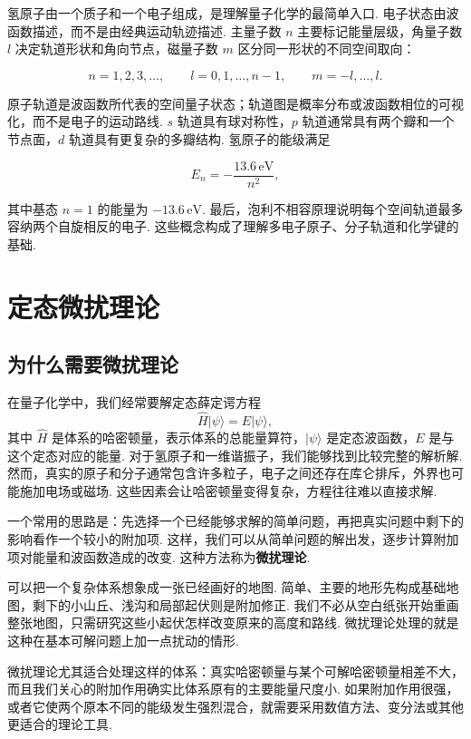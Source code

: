 \documentclass[UTF8,11pt,a4paper,openany]{ctexbook}
\newcommand{\ket}[1]{\lvert #1\rangle}\newcommand{\bra}[1]{\langle #1\rvert}
\newcommand{\term}[1]{\textbf{#1}}
\begin{document}
氢原子由一个质子和一个电子组成，是理解量子化学的最简单入口. 电子状态由波函数描述，而不是由经典运动轨迹描述. 主量子数 $n$ 主要标记能量层级，角量子数 $l$ 决定轨道形状和角向节点，磁量子数 $m$ 区分同一形状的不同空间取向：

\[
n=1,2,3,\ldots,
\qquad
l=0,1,\ldots,n-1,
\qquad
m=-l,\ldots,l.
\]

原子轨道是波函数所代表的空间量子状态；轨道图是概率分布或波函数相位的可视化，而不是电子的运动路线. $s$ 轨道具有球对称性，$p$ 轨道通常具有两个瓣和一个节点面，$d$ 轨道具有更复杂的多瓣结构. 氢原子的能级满足

\[
E_n=-\frac{13.6\,\text{eV}}{n^2},
\]

其中基态 $n=1$ 的能量为 $-13.6\,\text{eV}$. 最后，泡利不相容原理说明每个空间轨道最多容纳两个自旋相反的电子. 这些概念构成了理解多电子原子、分子轨道和化学键的基础. 

\chapter{定态微扰理论}

\section{为什么需要微扰理论}

在量子化学中，我们经常要解定态薛定谔方程
\[
\hat H\ket{\psi}=E\ket{\psi},
\]
其中 $\hat H$ 是体系的哈密顿量，表示体系的总能量算符，$\ket{\psi}$ 是定态波函数，$E$ 是与这个定态对应的能量. 对于氢原子和一维谐振子，我们能够找到比较完整的解析解. 然而，真实的原子和分子通常包含许多粒子，电子之间还存在库仑排斥，外界也可能施加电场或磁场. 这些因素会让哈密顿量变得复杂，方程往往难以直接求解. 

一个常用的思路是：先选择一个已经能够求解的简单问题，再把真实问题中剩下的影响看作一个较小的附加项. 这样，我们可以从简单问题的解出发，逐步计算附加项对能量和波函数造成的改变. 这种方法称为\term{微扰理论}. 

\begin{analogybox}
可以把一个复杂体系想象成一张已经画好的地图. 简单、主要的地形先构成基础地图，剩下的小山丘、浅沟和局部起伏则是附加修正. 我们不必从空白纸张开始重画整张地图，只需研究这些小起伏怎样改变原来的高度和路线. 微扰理论处理的就是这种在基本可解问题上加一点扰动的情形. 
\end{analogybox}

微扰理论尤其适合处理这样的体系：真实哈密顿量与某个可解哈密顿量相差不大，而且我们关心的附加作用确实比体系原有的主要能量尺度小. 如果附加作用很强，或者它使两个原本不同的能级发生强烈混合，就需要采用数值方法、变分法或其他更适合的理论工具. 
\end{document}
